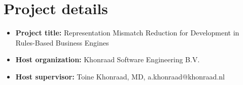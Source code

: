 \section*{Project details}

\begin{itemize}
    \item \textbf{Project title:} Representation Mismatch Reduction for Development in Rules-Based Business Engines
    \item \textbf{Host organization:} Khonraad Software Engineering B.V. 
    \item \textbf{Host supervisor:} Toine Khonraad, MD, a.khonraad@khonraad.nl
\end{itemize}